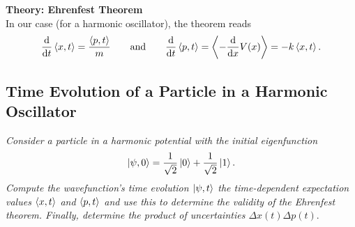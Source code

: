 \documentclass[11pt, a4paper]{article}
\newcommand{\eqtext}[1]{\qquad \text{#1} \qquad}
\begin{document}
\textbf{Theory: Ehrenfest Theorem}\\
In our case (for a harmonic oscillator), the theorem reads
\begin{equation*}
	\dv{t}\ev{x, t} = \frac{\ev{p, t}}{m} \eqtext{and} \dv{t}\ev{p, t} = \ev{-\dv{x}V(x)} = -k\ev{x, t}.
\end{equation*}

\subsection{Time Evolution of a Particle in a Harmonic Oscillator}
\textit{Consider a particle in a harmonic potential with the initial eigenfunction}
\begin{equation*}
	\ket{\psi, 0} = \frac{1}{\sqrt{2}}\ket{0} + \frac{1}{\sqrt{2}}\ket{1}.
\end{equation*}
\textit{Compute the wavefunction's time evolution $ \ket{\psi, t} $ the time-dependent expectation values $ \ev{x, t} $ and $ \ev{p, t} $ and use this to determine the validity of the Ehrenfest theorem. Finally, determine the product of uncertainties $ \Delta x(t) \Delta p(t) $}.
\end{document}
